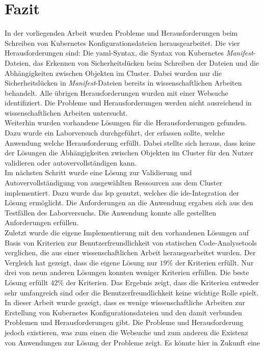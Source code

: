 \chapter{Fazit}\label{ch:conclusion}
In der vorliegenden Arbeit wurden Probleme und Herausforderungen beim Schreiben
von Kubernetes Konfigurationsdateien herausgearbeitet.
Die vier Herausforderungen sind: Die \ac{yaml}-Syntax, die Syntax von Kubernetes \textit{Manifest}-Dateien,
das Erkennen von Sicherheitslücken beim Schreiben der Dateien und die Abhängigkeiten zwischen Objekten im Cluster.
Dabei wurden nur die Sicherheitslücken in \textit{Manifest}-Dateien bereits in wissenschaftlichen Arbeiten behandelt.
Alle übrigen Herausforderungen wurden mit einer Websuche identifiziert.
Die Probleme und Herausforderungen werden nicht ausreichend in wissenschaftlichen Arbeiten untersucht.
\\
Weiterhin wurden vorhandene Lösungen für die Herausforderungen gefunden.
Dazu wurde ein Laborversuch durchgeführt, der erfassen sollte, welche Anwendung welche Herausforderung erfüllt.
Dabei stellte sich heraus, dass keine der Lösungen die Abhängigkeiten zwischen Objekten im Cluster
für den Nutzer validieren oder autovervollständigen kann.
\\
Im nächsten Schritt wurde eine Lösung zur Validierung und Autovervollständigung von ausgewählten
Ressourcen aus dem Cluster implementiert. Dazu wurde das \ac{lsp} genutzt, welches die
\ac{ide}-Integration der Lösung ermöglicht.
Die Anforderungen an die Anwendung ergaben sich aus den Testfällen des Laborversuchs.
Die Anwendung konnte alle gestellten Anforderungen erfüllen.
\\
Zuletzt wurde die eigene Implementierung mit den vorhandenen Lösungen auf Basis
von Kriterien zur Benutzerfreundlichkeit von statischen Code-Analysetools verglichen, die aus einer wissenschaftlichen Arbeit herausgearbeitet
wurden. Der Vergleich hat gezeigt, dass die eigene Lösung nur $19\%$ der Kriterien erfüllt.
Nur drei von neun anderen Lösungen konnten weniger Kriterien erfüllen.
Die beste Lösung erfüllt $42\%$ der Kriterien.
Das Ergebnis zeigt, dass die Kriterien entweder sehr umfangreich sind oder die Benutzerfreundlichkeit
keine wichtige Rolle spielt.
\\
In dieser Arbeit wurde gezeigt, dass es wenige wissenschaftliche Arbeiten zur Erstellung von
Kubernetes Konfigurationsdateien und den damit verbunden Problemen und Herausforderungen gibt.
Die Probleme und Herausforderung jedoch existieren, was zum einen die Websuche und zum anderen die
Existenz von Anwendungen zur Lösung der Probleme zeigt. Es könnte hier in Zukunft eine

